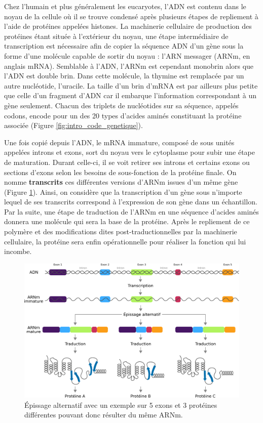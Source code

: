 Chez l'humain et plus généralement les eucaryotes, l'\acrshort{ADN} est contenu dans le noyau de la cellule où il se trouve condensé après plusieurs étapes de repliement à l'aide de protéines appelées histones. La machinerie cellulaire de production des protéines étant située à l'extérieur du noyau, une étape intermédiaire de transcription est nécessaire afin de copier la séquence \acrshort{ADN} d'un gène sous la forme d'une molécule capable de sortir du noyau : l'\acrlong{ARN} messager (\acrshort{ARNm}, en anglais \acrshort{mRNA}). Semblable à l'\acrshort{ADN}, l'\acrshort{ARNm} est cependant monobrin alors que l'ADN est double brin. Dans cette molécule, la thymine est remplacée par un autre nucléotide, l'uracile. La taille d'un brin d'\acrshort{mRNA} est par ailleurs plus petite que celle d'un fragment d'\acrshort{ADN} car il embarque l'information correspondant à un gène seulement. Chacun des triplets de nucléotides sur sa séquence, appelés codons, encode pour un des 20 types d'acides aminés constituant la protéine associée (Figure \ref{fig:intro_code_genetique}).

Une fois copié depuis l'\acrshort{ADN}, le \acrshort{mRNA} immature, composé de sous unités appelées introns et exons, sort du noyau vers le cytoplasme pour subir une étape de maturation. Durant celle-ci, il se voit retirer ses introns et certains exons ou sections d'exons selon les besoins de sous-fonction de la protéine finale. On nomme \textbf{\glspl{transcrit}} ces différentes versions d'ARNm issues d'un même gène (Figure \ref{fig:alternative_splicing}). Ainsi, on considère que la transcription d'un gène sous n'importe lequel de ses transcrits correspond à l'expression de son gène dans un échantillon. Par la suite, une étape de traduction de l'ARNm en une séquence d'acides aminés donnera une molécule qui sera la base de la protéine. Après le repliement de ce polymère et des modifications dites post-traductionnelles par la machinerie cellulaire, la protéine sera enfin opérationnelle pour réaliser la fonction qui lui incombe. 

\begin{figure}[hb]
    \centering
    \includegraphics[width=\textwidth]{img/intro/1_context/intro_1_alternative_splicing.pdf}
    \caption{Épissage alternatif avec un exemple sur 5 exons et 3 protéines différentes pouvant donc résulter du même ARNm.}
    \label{fig:alternative_splicing}
\end{figure}

